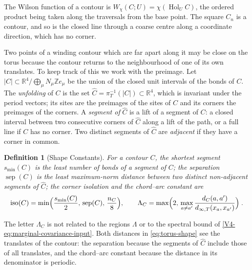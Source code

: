 \documentclass[11pt]{article}
\newcommand{\Hol}{\operatorname{Hol}}
\newcommand{\iso}{\operatorname{iso}}
\newcommand{\sep}{\operatorname{sep}}
\numberwithin{equation}{section}
\newtheorem{definition}[theorem]{Definition}
\theoremstyle{remark}
\theoremstyle{plain}
\begin{document}
The Wilson function of a contour is $W_{\chi}(C;U)=\chi(\Hol_UC)$, the ordered product being taken along the traversals from the base point. The square $C_n$ is a contour, and so is the closed line through a coarse centre along a coordinate direction, which has no corner.

Two points of a winding contour which are far apart along it may be close on the torus because the contour returns to the neighbourhood of one of its own translates. To keep track of this we work with the preimage. Let $| C|\subset\mathbb R^4/\bigoplus_{\mu}N_{\mu}\mathbb Ze_{\mu}$ be the union of the closed unit intervals of the bonds of $C$. The \emph{unfolding} of $C$ is the set $\widehat C=\pi_T^{-1}(| C|)\subset\mathbb R^4$, which is invariant under the period vectors; its sites are the preimages of the sites of $C$ and its corners the preimages of the corners. A \emph{segment of} $\widehat C$ is a lift of a segment of $C$: a closed interval between two consecutive corners of $\widehat C$ along a lift of the path, or a full line if $C$ has no corner. Two distinct segments of $\widehat C$ are \emph{adjacent} if they have a corner in common.

\begin{definition}[Shape Constants]\label{def:torus-shape}
For a contour $C$, the \emph{shortest segment} $s_{\min}(C)$ is the least number of bonds of a segment of $C$; the \emph{separation} $\sep(C)$ is the least maximum-norm distance between two distinct non-adjacent segments of $\widehat C$; the \emph{corner isolation} and the \emph{chord--arc constant} are
\begin{equation}\label{eq:torus-shape}
    \iso(C)=\min\Bigl(\frac{s_{\min}(C)}{2},\,\sep(C),\,\frac{n_C}{8}\Bigr),
    \qquad
    \Lambda_C=\max\Bigl(2,\,\max_{a\neq a'}\frac{d_C(a,a')}{d_{\infty,T}(x_a,x_{a'})}\Bigr)\;.
\end{equation}
\end{definition}

The letter $\Lambda_C$ is not related to the regions $\Lambda$ or to the spectral bound of \eqref{V4-eq:marginal-covariance-input}. Both distances in \eqref{eq:torus-shape} see the translates of the contour: the separation because the segments of $\widehat C$ include those of all translates, and the chord--arc constant because the distance in its denominator is periodic.
\end{document}
